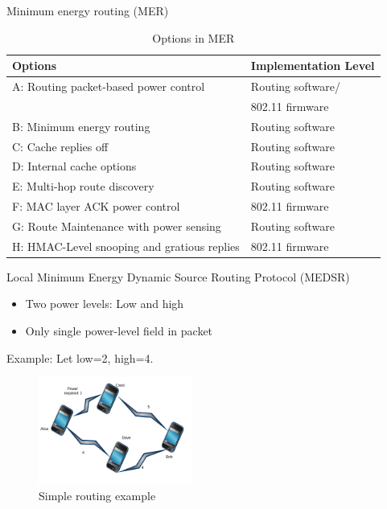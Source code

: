 \documentclass{beamer}
\begin{document}
\begin{frame}{Minimum energy routing (MER)}

\begin{table}[b]
  \begin{tabular}{ll}
    Options & Implementation Level  \\
    \hline
    A: Routing packet-based power control & Routing software/\\ &802.11 firmware \\
    B: Minimum energy routing & Routing software \\
    C: Cache replies off & Routing software \\
    D: Internal cache options & Routing software \\
    E: Multi-hop route discovery & Routing software \\
    F: MAC layer ACK power control & 802.11 firmware \\
    G: Route Maintenance with power sensing & Routing software \\
    H: HMAC-Level snooping and gratious replies & 802.11 firmware \\
  \end{tabular}
  \caption{Options in MER\cite{doshi2002demand}}
  \label{tbl:mer-options}
\end{table}
\end{frame}


\begin{frame}{Local Minimum Energy Dynamic Source Routing Protocol (MEDSR)\cite{tanque2007minimum}}
    \begin{itemize}
        \item Two power levels: Low and high
        \item Only single power-level field in packet
    \end{itemize}
    Example: Let low=2, high=4.
    \begin{figure}
\centering
\includegraphics[width=0.45\textwidth]{images/far}
\caption{Simple routing example}
\end{figure}
\end{frame}
\end{document}

